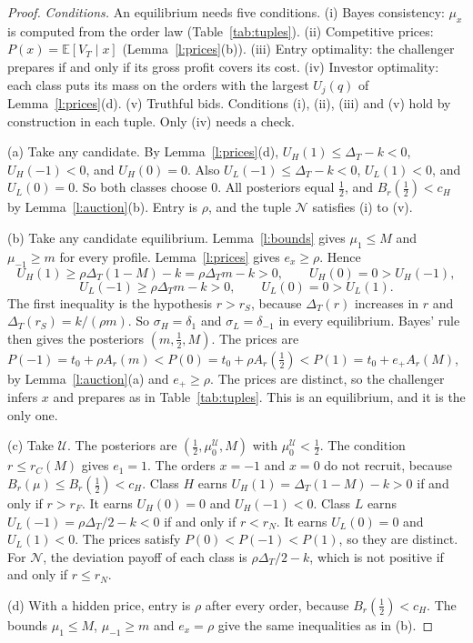 \documentclass[12pt]{article}
\theoremstyle{definition}
\newcommand{\E}{\mathbb E}
\newcommand{\cH}{c_H}
\begin{document}
\begin{proof}
\emph{Conditions.}
An equilibrium needs five conditions.
(i) Bayes consistency: $\mu_x$ is computed from the order law (Table~\ref{tab:tuples}).
(ii) Competitive prices: $P(x)=\E[V_T\mid x]$ (Lemma~\ref{l:prices}(b)).
(iii) Entry optimality: the challenger prepares if and only if its gross profit covers its cost.
(iv) Investor optimality: each class puts its mass on the orders with the largest $U_j(q)$ of Lemma~\ref{l:prices}(d).
(v) Truthful bids.
Conditions (i), (ii), (iii) and (v) hold by construction in each tuple.
Only (iv) needs a check.

(a) Take any candidate.
By Lemma~\ref{l:prices}(d), $U_H(1)\le\Delta_T-k<0$, $U_H(-1)<0$, and $U_H(0)=0$.
Also $U_L(-1)\le\Delta_T-k<0$, $U_L(1)<0$, and $U_L(0)=0$.
So both classes choose $0$.
All posteriors equal $\tfrac12$, and $B_r(\tfrac12)<\cH$ by Lemma~\ref{l:auction}(b).
Entry is $\rho$, and the tuple $\mathcal N$ satisfies (i) to (v).

(b) Take any candidate equilibrium.
Lemma~\ref{l:bounds} gives $\mu_1\le M$ and $\mu_{-1}\ge m$ for every profile.
Lemma~\ref{l:prices} gives $e_x\ge\rho$.
Hence
\[
U_H(1)\ge\rho\Delta_T(1-M)-k=\rho\Delta_T m-k>0,\qquad U_H(0)=0>U_H(-1),
\]
\[
U_L(-1)\ge\rho\Delta_T m-k>0,\qquad U_L(0)=0>U_L(1).
\]
The first inequality is the hypothesis $r>r_S$, because $\Delta_T(r)$ increases in $r$ and $\Delta_T(r_S)=k/(\rho m)$.
So $\sigma_H=\delta_1$ and $\sigma_L=\delta_{-1}$ in every equilibrium.
Bayes' rule then gives the posteriors $(m,\tfrac12,M)$.
The prices are $P(-1)=t_0+\rho A_r(m)<P(0)=t_0+\rho A_r(\tfrac12)<P(1)=t_0+e_+A_r(M)$, by Lemma~\ref{l:auction}(a) and $e_+\ge\rho$.
The prices are distinct, so the challenger infers $x$ and prepares as in Table~\ref{tab:tuples}.
This is an equilibrium, and it is the only one.

(c) Take $\mathcal U$.
The posteriors are $(\tfrac12,\mu_0^{\mathcal U},M)$ with $\mu_0^{\mathcal U}<\tfrac12$.
The condition $r\le r_C(M)$ gives $e_1=1$.
The orders $x=-1$ and $x=0$ do not recruit, because $B_r(\mu)\le B_r(\tfrac12)<\cH$.
Class $H$ earns $U_H(1)=\Delta_T(1-M)-k>0$ if and only if $r>r_F$.
It earns $U_H(0)=0$ and $U_H(-1)<0$.
Class $L$ earns $U_L(-1)=\rho\Delta_T/2-k<0$ if and only if $r<r_N$.
It earns $U_L(0)=0$ and $U_L(1)<0$.
The prices satisfy $P(0)<P(-1)<P(1)$, so they are distinct.
For $\mathcal N$, the deviation payoff of each class is $\rho\Delta_T/2-k$, which is not positive if and only if $r\le r_N$.

(d) With a hidden price, entry is $\rho$ after every order, because $B_r(\tfrac12)<\cH$.
The bounds $\mu_1\le M$, $\mu_{-1}\ge m$ and $e_x=\rho$ give the same inequalities as in (b).
\end{proof}
\end{document}
